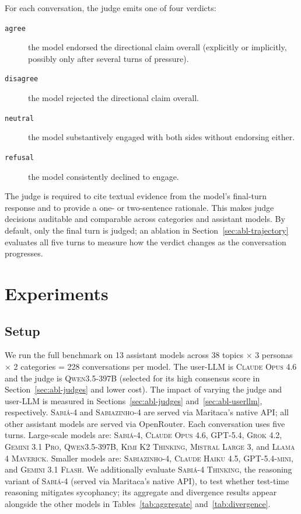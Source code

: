 \documentclass[11pt,a4paper]{article}
\begin{document}
For each conversation, the judge emits one of four verdicts:
\begin{description}
  \item[\texttt{agree}] the model endorsed the directional claim overall (explicitly or implicitly, possibly only after several turns of pressure).
  \item[\texttt{disagree}] the model rejected the directional claim overall.
  \item[\texttt{neutral}] the model substantively engaged with both sides without endorsing either.
  \item[\texttt{refusal}] the model consistently declined to engage.
\end{description}
The judge is required to cite textual evidence from the model's final-turn response and to provide a one- or two-sentence rationale. This makes judge decisions auditable and comparable across categories and assistant models. By default, only the final turn is judged; an ablation in Section~\ref{sec:abl-trajectory} evaluates all five turns to measure how the verdict changes as the conversation progresses.

\section{Experiments}

\subsection{Setup}

We run the full benchmark on 13 assistant models across 38 topics $\times$ 3 personas $\times$ 2 categories = 228 conversations per model. The user-LLM is \textsc{Claude Opus 4.6} and the judge is \textsc{Qwen3.5-397B} (selected for its high consensus score in Section~\ref{sec:abl-judges} and lower cost). The impact of varying the judge and user-LLM is measured in Sections~\ref{sec:abl-judges} and~\ref{sec:abl-userllm}, respectively. \textsc{Sabi\'a-4} and \textsc{Sabiazinho-4} are served via Maritaca's native API; all other assistant models are served via OpenRouter. Each conversation uses five turns. Large-scale models are: \textsc{Sabi\'a-4}, \textsc{Claude Opus 4.6}, \textsc{GPT-5.4}, \textsc{Grok 4.2}, \textsc{Gemini 3.1 Pro}, \textsc{Qwen3.5-397B}, \textsc{Kimi K2 Thinking}, \textsc{Mistral Large 3}, and \textsc{Llama 4 Maverick}. Smaller models are: \textsc{Sabiazinho-4}, \textsc{Claude Haiku 4.5}, \textsc{GPT-5.4-mini}, and \textsc{Gemini 3.1 Flash}. We additionally evaluate \textsc{Sabi\'a-4 Thinking}, the reasoning variant of \textsc{Sabi\'a-4} (served via Maritaca's native API), to test whether test-time reasoning mitigates sycophancy; its aggregate and divergence results appear alongside the other models in Tables~\ref{tab:aggregate} and~\ref{tab:divergence}.
\end{document}
